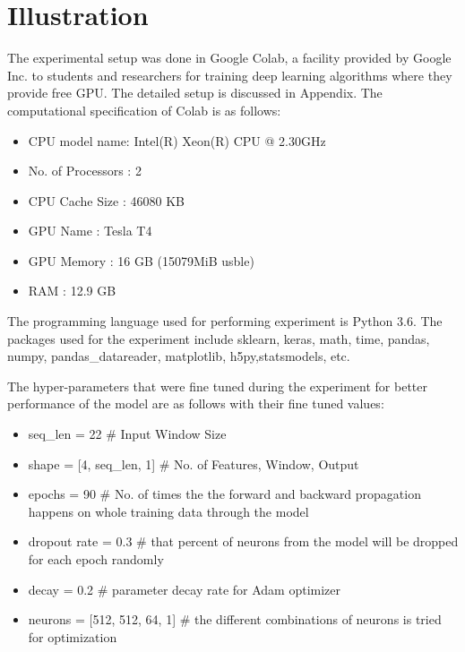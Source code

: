 \section{Illustration}
The experimental setup was done in Google Colab, a facility provided by Google Inc. to students and researchers for training deep learning algorithms where they provide free GPU. The detailed setup is discussed in Appendix. The computational specification of Colab is as follows:
\begin{itemize}
\item CPU model name: Intel(R) Xeon(R) CPU @ 2.30GHz  
\item No. of Processors : 2
\item CPU Cache Size : 46080 KB
\item GPU Name : Tesla T4
\item GPU Memory : 16 GB (15079MiB usble)
\item RAM : 12.9 GB
\end{itemize}

The programming language used for performing experiment is Python 3.6. The packages used for the experiment include sklearn, keras, math, time, pandas, numpy, pandas\_datareader, matplotlib, h5py,statsmodels, etc.

The hyper-parameters that were fine tuned during the experiment for better performance of the model are as follows with their fine tuned values:

\begin{itemize}

\item seq\_len = 22		\# Input Window Size

\item shape = [4, seq\_len, 1] 	\# No. of Features, Window, Output

\item epochs = 90 		\# No. of times the the forward and backward propagation happens on whole training data through the model

\item dropout rate = 0.3 		\# that percent of neurons from the model will be dropped for each epoch randomly

\item decay = 0.2 		\# parameter decay rate for Adam optimizer

\item neurons = [512, 512, 64, 1]	\# the different combinations of neurons is tried for optimization


\end{itemize}

